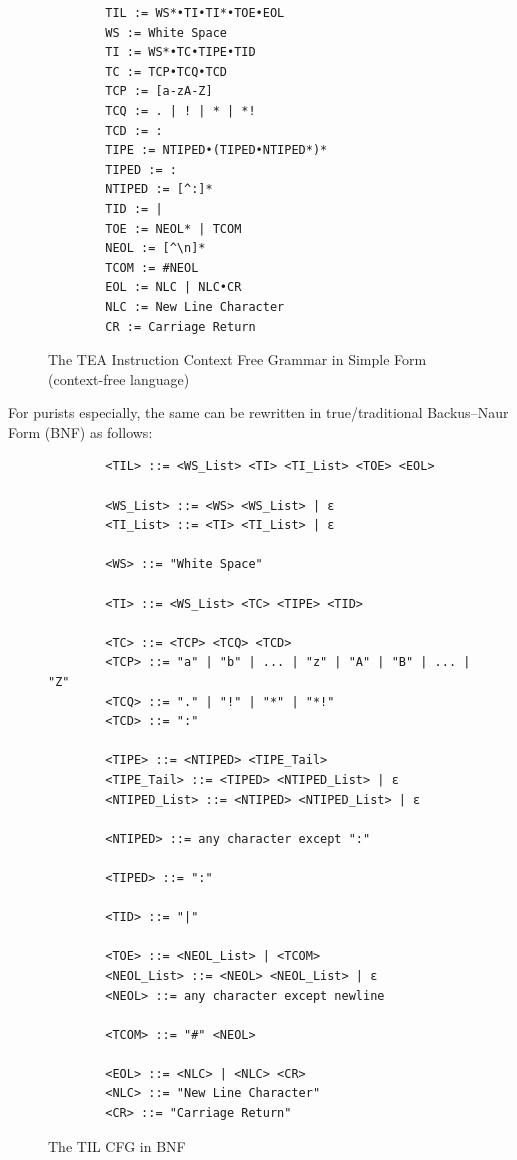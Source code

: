 \documentclass[a4paper, 18pt]{book} %
\begin{document}
    \begin{figure}[H]
  \centering
  \begin{tcolorbox}[myterminalstyle, title=TEA Instruction Line (Simple Grammar)]
  \begin{verbatim}
	    TIL := WS*•TI•TI*•TOE•EOL
	    WS := White Space
	    TI := WS*•TC•TIPE•TID
	    TC := TCP•TCQ•TCD
	    TCP := [a-zA-Z]
	    TCQ := . | ! | * | *!  
	    TCD := :
	    TIPE := NTIPED•(TIPED•NTIPED*)*
	    TIPED := :
	    NTIPED := [^:]*
	    TID := |
	    TOE := NEOL* | TCOM
	    NEOL := [^\n]*
	    TCOM := #NEOL
	    EOL := NLC | NLC•CR
	    NLC := New Line Character
	    CR := Carriage Return
  \end{verbatim}
  \end{tcolorbox}
  \caption{The TEA Instruction Context Free Grammar in Simple Form (context-free language)}
  \label{FIG3}
\end{figure}


For purists especially, the same can be rewritten in true/traditional Backus–Naur Form (BNF) as follows:


    \begin{figure}[H]
  \centering
  \begin{tcolorbox}[myterminalstyle, title=TEA Instruction Line (BNF Grammar)]
  \begin{verbatim}
		<TIL> ::= <WS_List> <TI> <TI_List> <TOE> <EOL>
		
		<WS_List> ::= <WS> <WS_List> | ε
		<TI_List> ::= <TI> <TI_List> | ε
		
		<WS> ::= "White Space"
		
		<TI> ::= <WS_List> <TC> <TIPE> <TID>
		
		<TC> ::= <TCP> <TCQ> <TCD>
		<TCP> ::= "a" | "b" | ... | "z" | "A" | "B" | ... | "Z"
		<TCQ> ::= "." | "!" | "*" | "*!"
		<TCD> ::= ":"
		
		<TIPE> ::= <NTIPED> <TIPE_Tail>
		<TIPE_Tail> ::= <TIPED> <NTIPED_List> | ε
		<NTIPED_List> ::= <NTIPED> <NTIPED_List> | ε
		
		<NTIPED> ::= any character except ":"
		
		<TIPED> ::= ":"
		
		<TID> ::= "|"
		
		<TOE> ::= <NEOL_List> | <TCOM>
		<NEOL_List> ::= <NEOL> <NEOL_List> | ε
		<NEOL> ::= any character except newline
		
		<TCOM> ::= "#" <NEOL>
		
		<EOL> ::= <NLC> | <NLC> <CR>
		<NLC> ::= "New Line Character"
		<CR> ::= "Carriage Return"
  \end{verbatim}
  \end{tcolorbox}
  \caption{The TIL CFG in BNF}
  \label{FIG4}
\end{figure}
\end{document}
